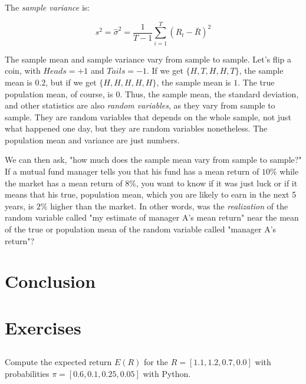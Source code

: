 The \textit{sample variance} is:

\begin{equation}
    s^2 = \hat{\sigma}^2 = \frac{1}{T - 1}\sum_{i=1}^T (R_t - \bar{R})^2
\end{equation}

The sample mean and sample variance vary from sample to sample.
Let's flip a coin, with $Heads = +1$ and $Tails = -1$.
If we get $\{H, T, H, H, T\}$, the sample mean is 
$0.2$, but if we get $\{H, H, H, H, H\}$, the sample mean is $1$.
The true population mean, of course, is $0$.
Thus, the sample mean, the standard deviation, and other 
statistics are also \textit{random variables}, as 
they vary from sample to sample.
They are random variables that depends on the whole sample, 
not just what happened one day, but they are random variables
nonetheless. The population mean and variance are just 
numbers. 

We can then ask, "how much does the sample mean vary from
sample to sample?" If a mutual fund manager tells you
that his fund has a mean return of $10\%$ while the 
market has a mean return of $8\%$, you want to know 
if it was just luck or if it means that his true,
population mean, which you are likely to earn in the 
next 5 years, is $2\%$ higher than the market.
In other words, was the \textit{realization} of the
random variable called "my estimate of manager A's 
mean return" near the mean of the true or population mean
of the random variable called "manager A's return"?

\section{Conclusion}

\newpage
\section{Exercises}

\subsection{}

Compute the expected return $E(R)$ for the 
$R = [1.1, 1.2, 0.7, 0.0]$ with probabilities
$\pi = [0.6, 0.1, 0.25, 0.05]$ with Python.

\subsection{}

